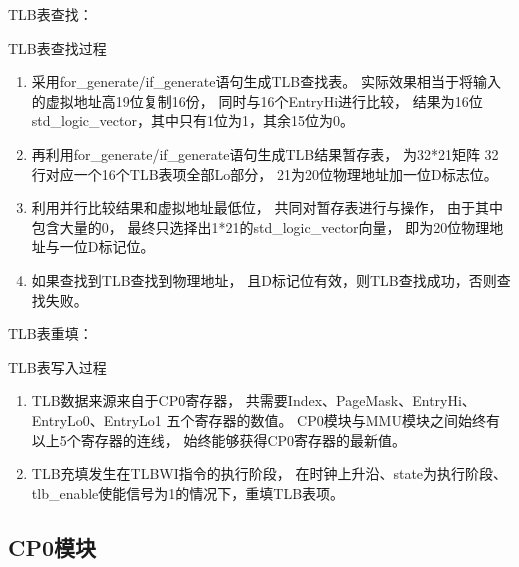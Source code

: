             TLB表查找：%
            \begin{minipage}[t]{0.8\linewidth}
                TLB表查找过程 %
                \begin{enumerate}
                \item
                    采用for\_generate/if\_generate语句生成TLB查找表。%
                    实际效果相当于将输入的虚拟地址高19位复制16份，%
                    同时与16个EntryHi进行比较，%
                    结果为16位std\_logic\_vector，其中只有1位为1，其余15位为0。%
                \item
                    再利用for\_generate/if\_generate语句生成TLB结果暂存表，%
                    为32*21矩阵%
                    32行对应一个16个TLB表项全部Lo部分，%
                    21为20位物理地址加一位D标志位。%
                \item
                    利用并行比较结果和虚拟地址最低位，%
                    共同对暂存表进行与操作，%
                    由于其中包含大量的0，%
                    最终只选择出1*21的std\_logic\_vector向量，%
                    即为20位物理地址与一位D标记位。%
                \item
                    如果查找到TLB查找到物理地址，%
                    且D标记位有效，则TLB查找成功，否则查找失败。%
                \end{enumerate}
            \end{minipage}

            TLB表重填：%
            \begin{minipage}[t]{0.8\linewidth}
                TLB表写入过程%
                \begin{enumerate}
                \item
                    TLB数据来源来自于CP0寄存器，%
                    共需要Index、PageMask、EntryHi、EntryLo0、EntryLo1%
                    五个寄存器的数值。%
                    CP0模块与MMU模块之间始终有以上5个寄存器的连线，%
                    始终能够获得CP0寄存器的最新值。%
                \item
                    TLB充填发生在TLBWI指令的执行阶段，%
                    在时钟上升沿、state为执行阶段、%
                    tlb\_enable使能信号为1的情况下，重填TLB表项。%
                \end{enumerate}
            \end{minipage}

    \subsection{CP0模块}
